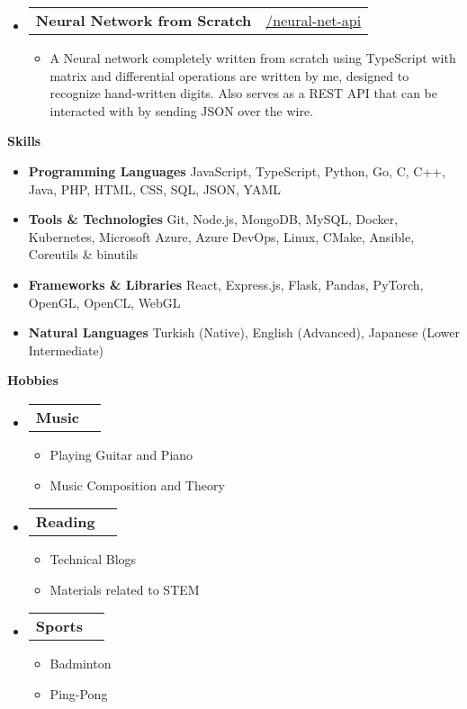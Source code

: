 \documentclass[letterpaper,12pt]{article}[leftmargin=*]
\makeatletter
\def \githubicon {\faGithub}
\def \entryspacing {-0pt}
\renewcommand{\section}[2]{\vspace{5pt}
  \colorbox{secondary}{\color{white}\raggedbottom\normalsize\textbf{{#1}{\hspace{7pt}#2}}}
}
\newcommand{\resumeEntryStart}{\begin{itemize}[leftmargin=2.5mm]}
\newcommand{\resumeEntryEnd}{\end{itemize}\vspace{\entryspacing}}
\newcommand{\resumeItemListStart}{\begin{itemize}[leftmargin=4.5mm]}
\newcommand{\resumeItemListEnd}{\end{itemize}}
\newcommand{\resumeItem}[1]{
  \item\small{
    {#1 \vspace{-2pt}}
  }
}
\newcommand{\resumeEntryTD}[2]{
  \vspace{-1pt}\item[]
    \begin{tabularx}{0.97\textwidth}{X@{\hspace{60pt}}r}
      \textbf{\color{primary}#1} & {\firabook\color{accent}\small#2} \\
    \end{tabularx}\vspace{-6pt}
}
\newcommand{\resumeEntryS}[2]{
  \item[]\small{
    \textbf{\color{primary}#1 }{ #2 \vspace{-6pt}}
  }
}
\makeatother
\begin{document}
  \resumeEntryStart
    \resumeEntryTD
      {Neural Network from Scratch}{\githubicon \href{https://github.com/yvesyil/neural-net-api}{ /neural-net-api}}
    \resumeItemListStart
      \resumeItem {A Neural network completely written from scratch using TypeScript with matrix and differential operations are written by me, designed to recognize hand-written digits. Also serves as a REST API that can be interacted with by sending JSON over the wire.}
    \resumeItemListEnd
  \resumeEntryEnd

\section{\faGears}{Skills}
  \resumeEntryStart
    \resumeEntryS{Programming Languages} {JavaScript, TypeScript, Python, Go, C, C++, Java, PHP, HTML, CSS, SQL, JSON, YAML}
    \resumeEntryS{Tools \& Technologies} {Git, Node.js, MongoDB, MySQL, Docker, Kubernetes, Microsoft Azure, Azure DevOps, Linux, CMake, Ansible, Coreutils \& binutils}
    \resumeEntryS{Frameworks \& Libraries} {React, Express.js, Flask, Pandas, PyTorch, OpenGL, OpenCL, WebGL}
    \resumeEntryS{Natural Languages} {Turkish (Native), English (Advanced), Japanese (Lower Intermediate)}
  \resumeEntryEnd

\section{\faHeart}{Hobbies}
  \resumeEntryStart
    \resumeEntryTD{Music}{}
    \resumeItemListStart
      \resumeItem{Playing Guitar and Piano}
      \resumeItem{Music Composition and Theory}
    \resumeItemListEnd
    \resumeEntryTD{Reading}{}
    \resumeItemListStart
      \resumeItem{Technical Blogs}
      \resumeItem{Materials related to STEM}
    \resumeItemListEnd
    \resumeEntryTD{Sports}{}
    \resumeItemListStart
      \resumeItem{Badminton}
      \resumeItem{Ping-Pong}
    \resumeItemListEnd
  \resumeEntryEnd
\end{document}
